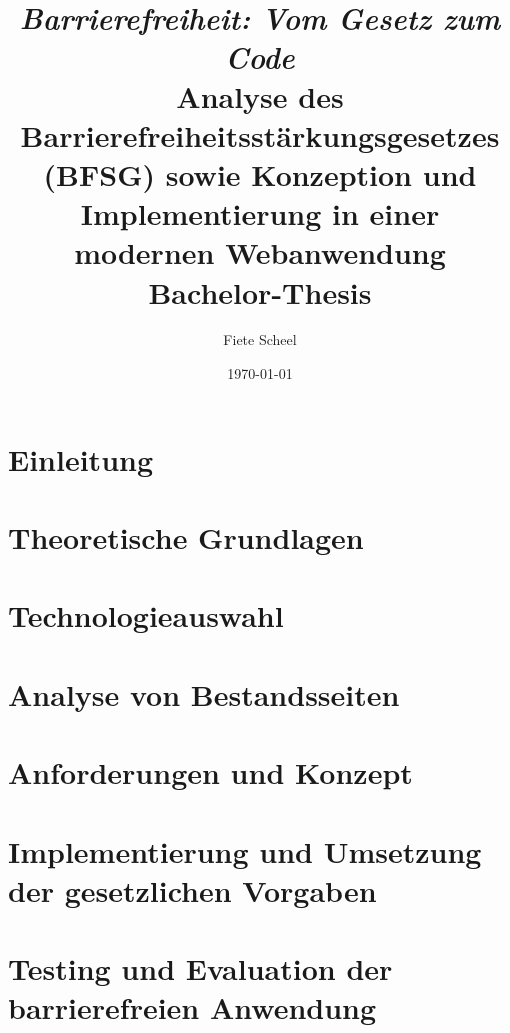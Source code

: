 \documentclass[a4paper, ngerman, 12pt]{scrreprt}
\begin{document}
\title{\normalfont
    {\normalsize\textit{Barrierefreiheit: Vom Gesetz zum Code}}\\[0.5em]
    {\Large\bfseries Analyse des Barrierefreiheitsstärkungsgesetzes (BFSG) sowie Konzeption und Implementierung in einer modernen Webanwendung}\\[1em]
    {\large Bachelor-Thesis}
}

\author{\large Fiete Scheel} %
\date{\large \today} %

\maketitle

\newpage
\tableofcontents

\newpage
\chapter{Einleitung}


\chapter{Theoretische Grundlagen}


\chapter{Technologieauswahl}


\chapter{Analyse von Bestandsseiten}


\chapter{Anforderungen und Konzept}


\chapter{Implementierung und Umsetzung der gesetzlichen Vorgaben}


\chapter{Testing und Evaluation der barrierefreien Anwendung}

\end{document}
